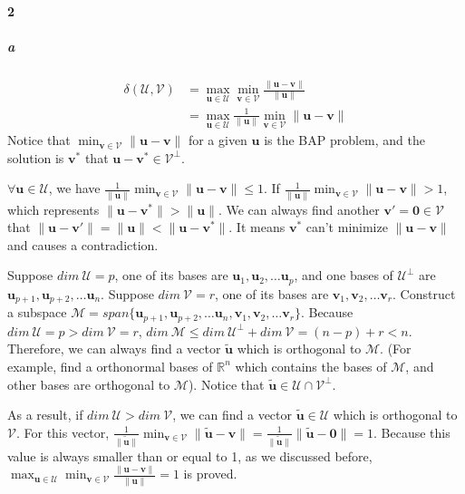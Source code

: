 \documentclass[22pt]{article}
\begin{document}
	\paragraph{2}
		\subparagraph{a} 
		\begin{align}
			\delta(\mathcal{U,V}) & = \max_{\mathbf{u}\in \mathcal{U}} \min_{\mathbf{v}\in\mathcal{V}} \frac{\|\mathbf{u-v}\|}{\|\mathbf{u}\|}\\
			& =  \max_{\mathbf{u}\in \mathcal{U}} \frac{1}{\|\mathbf{u}\|} \min_{\mathbf{v}\in\mathcal{V}}\|\mathbf{u-v}\|
		\end{align}
		Notice that $\min_{\mathbf{v}\in\mathcal{V}}\|\mathbf{u-v}\|$ for a given $\mathbf{u}$ is the BAP problem, and the solution is $\mathbf{v^*}$ that $\mathbf{u-v^*} \in \mathcal{V}^\perp$.

		$\forall \mathbf{u}\in \mathcal{U}$, we have $\frac{1}{\|\mathbf{u}\|} \min_{\mathbf{v}\in\mathcal{V}}\|\mathbf{u-v}\| \leq 1$. If $\frac{1}{\|\mathbf{u}\|} \min_{\mathbf{v}\in\mathcal{V}}\|\mathbf{u-v}\| > 1$, which represents $\|\mathbf{u-v}^*\| > \|\mathbf{u}\|$. We can always find another $\mathbf{v'=0} \in \mathcal{V}$ that $\|\mathbf{u-v'}\| = \|\mathbf{u}\| < \|\mathbf{u-v}^*\|$. It means $\mathbf{v}^*$ can't minimize $\|\mathbf{u-v}\|$ and causes a contradiction.

		Suppose $dim\ \mathcal{U} = p$, one of its bases are $\mathbf{u}_1,\mathbf{u}_2,\dots \mathbf{u}_p$, and one bases of $\mathcal{U}^\perp$ are $\mathbf{u}_{p+1},\mathbf{u}_{p+2},\dots \mathbf{u}_{n}$. Suppose $dim\ \mathcal{V} = r$, one of its bases are $\mathbf{v}_1,\mathbf{v}_2,\dots \mathbf{v}_r$. Construct a subspace $\mathcal{M}= span\{\mathbf{u}_{p+1},\mathbf{u}_{p+2},\dots \mathbf{u}_{n},\mathbf{v}_1,\mathbf{v}_2,\dots \mathbf{v}_r\}$. Because $dim\ \mathcal{U} = p>dim\ \mathcal{V} = r$, $dim\ \mathcal{M} \leq dim\ \mathcal{U}^\perp+dim\ \mathcal{V} = (n-p)+r < n$. Therefore, we can always find a vector $\tilde{\mathbf{u}}$ which is orthogonal to $\mathcal{M}$. (For example, find a orthonormal bases of $\mathbb{R}^n$ which contains the bases of $\mathcal{M}$, and other bases are orthogonal to $\mathcal{M}$). Notice that $\tilde{\mathbf{u}}\in \mathcal{U\cap V^\perp}$.

		As a result, if $dim\ \mathcal{U} >dim\ \mathcal{V}$, we can find a vector $\tilde{\mathbf{u}}\in \mathcal{U}$ which is orthogonal to $\mathcal{V}$. For this vector, $\frac{1}{\|\mathbf{\tilde{u}}\|}\min_{\mathbf{v}\in\mathcal{V}}\|\mathbf{\tilde{u}-v}\| = \frac{1}{\|\mathbf{\tilde{u}}\|}\|\mathbf{\tilde{u}-0}\|=1$. Because this value is always smaller than or equal to 1, as we discussed before, $ \max_{\mathbf{u}\in \mathcal{U}} \min_{\mathbf{v}\in\mathcal{V}} \frac{\|\mathbf{u-v}\|}{\|\mathbf{u}\|}= 1$ is proved. 
\end{document}
